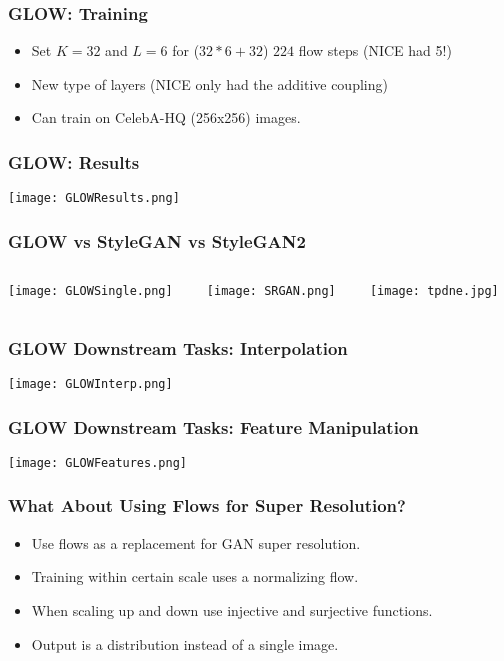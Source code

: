 \begin{frame}
    \frametitle{GLOW: Training}
    \begin{itemize}
        \item Set $K=32$ and $L=6$ for ($32*6 + 32$) $224$ flow steps (NICE had
            5!)
        \item New type of layers (NICE only had the additive coupling)
        \item Can train on CelebA-HQ (256x256) images.
    \end{itemize}
\end{frame}

\begin{frame}
    \frametitle{GLOW: Results}
    \center\texttt{[image: GLOWResults.png]}
\end{frame}

\begin{frame}
    \frametitle{GLOW vs StyleGAN vs StyleGAN2}
    \begin{columns}
        \begin{column}{0.3\paperwidth}
            \center\texttt{[image: GLOWSingle.png]}
            \\
        \end{column}
        \begin{column}{0.3\paperwidth}
            \center\texttt{[image: SRGAN.png]}
            \\
        \end{column}
        \begin{column}{0.3\paperwidth}
            \center\texttt{[image: tpdne.jpg]}
            \\
        \end{column}
    \end{columns}
\end{frame}

\begin{frame}
    \frametitle{GLOW Downstream Tasks: Interpolation}
    \center\texttt{[image: GLOWInterp.png]}
\end{frame}

\begin{frame}
    \frametitle{GLOW Downstream Tasks: Feature Manipulation}
    \center\texttt{[image: GLOWFeatures.png]}
\end{frame}

\begin{frame}
    \frametitle{What About Using Flows for Super Resolution?}
    \begin{itemize}
        \item Use flows as a replacement for GAN super resolution.
        \item Training within certain scale uses a normalizing flow.
        \item When scaling up and down use injective and surjective functions.
        \item Output is a distribution instead of a single image.
    \end{itemize}
\end{frame}


